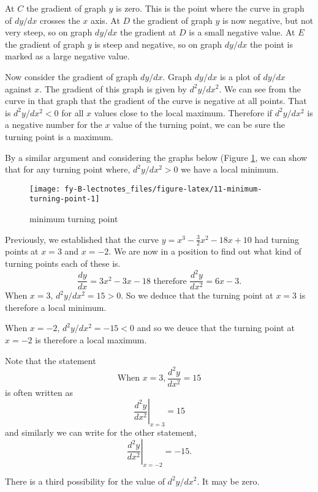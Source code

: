 \documentclass[
  11pt,
  oneside]{book}
\newcommand{\slide}{}
\theoremstyle{definition}
\theoremstyle{definition}
\theoremstyle{definition}
\theoremstyle{definition}
\theoremstyle{remark}
\begin{document}
At \(C\) the gradient of graph \(y\) is zero. This is the point where the curve in graph of \(dy/dx\) crosses the \(x\) axis. At \(D\) the gradient of graph \(y\) is now negative, but not very steep, so on graph \(dy/dx\) the gradient at \(D\) is a small negative value. At \(E\) the gradient of graph \(y\) is steep and negative, so on graph \(dy/dx\) the point is marked as a large negative value.

Now consider the gradient of graph \(dy/dx\). Graph \(dy/dx\) is a plot of \(dy/dx\) against \(x\). The gradient of this graph is given by \(d^2y/dx^2\). We can see from the curve in that graph that the gradient of the curve is negative at all points. That is \(d^2y/dx^2<0\) for all \(x\) values close to the local maximum. Therefore if \(d^2y/dx^2\) is a negative number for the \(x\) value of the turning point, we can be sure the turning point is a maximum.
\slide

By a similar argument and considering the graphs below (Figure \ref{fig:11-minimum-turning-point}, we can show that for any turning point where, \(d^2y/dx^2>0\) we have a local minimum.

\begin{figure}

{\centering \texttt{[image: fy-B-lectnotes\_files/figure-latex/11-minimum-turning-point-1]} 

}

\caption{minimum turning point}\label{fig:11-minimum-turning-point}
\end{figure}
\slide

Previously, we established that the curve \(y = x^3-\frac32 x^2-18x+10\) had turning points at \(x=3\) and \(x=-2\). We are now in a position to find out what kind of turning points each of these is.
\[
\frac{dy}{dx} = 3x^2-3x-18\text{ therefore } \frac{d^2y}{dx^2} = 6x-3.
\]
When \(x = 3\), \(d^2y/dx^2=15 > 0\). So we deduce that the turning point at \(x=3\) is therefore a local minimum.

When \(x = -2\), \(d^2y/dx^2 = -15 < 0\) and so we deuce that the turning point at \(x = -2\) is therefore a local maximum.

Note that the statement
\[
\text{When }x = 3, \frac{d^2y}{dx^2} = 15
\]
is often written as
\[
\left.\frac{d^2y}{dx^2}\right\vert_{x=3} = 15
\]
and similarly we can write for the other statement,
\[
\left.\frac{d^2y}{dx^2}\right\vert_{x=-2} = -15.
\]
\slide

There is a third possibility for the value of \(d^2y/dx^2\). It may be zero.
\end{document}
